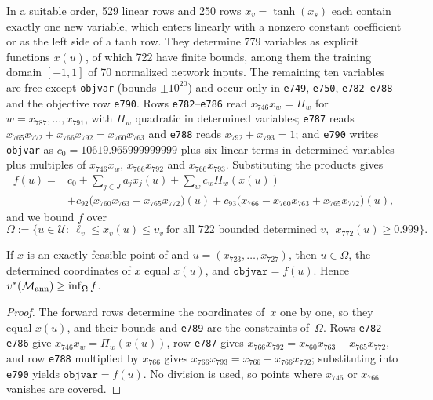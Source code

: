 In a suitable order, 529 linear rows and 250 rows $x_v=\tanh(x_s)$ each contain exactly one new variable, which enters linearly with a nonzero constant coefficient or as the left side of a tanh row.
They determine 779 variables as explicit functions $x(u)$, of which 722 have finite bounds, among them the training domain $[-1,1]$ of 70 normalized network inputs.
The remaining ten variables are free except \texttt{objvar} (bounds $\pm10^{20}$) and occur only in \texttt{e749}, \texttt{e750}, \texttt{e782}--\texttt{e788} and the objective row \texttt{e790}.
Rows \texttt{e782}--\texttt{e786} read $x_{746}x_w=\Pi_w$ for $w=x_{787},\dots,x_{791}$, with $\Pi_w$ quadratic in determined variables; \texttt{e787} reads $x_{765}x_{772}+x_{766}x_{792}=x_{760}x_{763}$ and \texttt{e788} reads $x_{792}+x_{793}=1$; and \texttt{e790} writes \texttt{objvar} as $c_0=10619.965999999999$ plus six linear terms in determined variables plus multiples of $x_{746}x_w$, $x_{766}x_{792}$ and $x_{766}x_{793}$.
Substituting the products gives
\[
\begin{aligned}
f(u)={}&c_0+\textstyle\sum_{j\in J}a_jx_j(u)+\sum_wc_w\Pi_w(x(u))\\
&+c_{92}\bigl(x_{760}x_{763}-x_{765}x_{772}\bigr)(u)+c_{93}\bigl(x_{766}-x_{760}x_{763}+x_{765}x_{772}\bigr)(u),
\end{aligned}
\]
and we bound $f$ over
\[
\Omega:=\bigl\{u\in\mathcal U:\ \ell_v\le x_v(u)\le\upsilon_v\ \text{for all 722 bounded determined }v,\ \ x_{772}(u)\ge0.999\bigr\}.
\]

\begin{lemma}[reduction]\label{lem:ann-reduction}
If $x$ is an exactly feasible point of  and $u=(x_{723},\dots,x_{727})$, then $u\in\Omega$, the determined coordinates of $x$ equal $x(u)$, and $\texttt{objvar}=f(u)$.
Hence $v^{*}(\mathcal{M}_{\mathrm{ann}})\ge\inf_\Omega f$.
\end{lemma}

\begin{proof}
The forward rows determine the coordinates of~$x$ one by one, so they equal $x(u)$, and their bounds and \texttt{e789} are the constraints of~$\Omega$.
Rows \texttt{e782}--\texttt{e786} give $x_{746}x_w=\Pi_w(x(u))$, row \texttt{e787} gives $x_{766}x_{792}=x_{760}x_{763}-x_{765}x_{772}$, and row \texttt{e788} multiplied by $x_{766}$ gives $x_{766}x_{793}=x_{766}-x_{766}x_{792}$; substituting into \texttt{e790} yields $\texttt{objvar}=f(u)$.
No division is used, so points where $x_{746}$ or $x_{766}$ vanishes are covered.
\end{proof}

